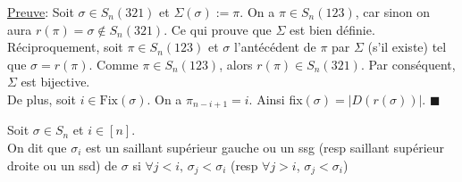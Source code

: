 \underline{Preuve}:
Soit $\sigma \in S_{n}(321)$ et $\Sigma(\sigma):=\pi$. On a $\pi \in S_{n}(123)$, car sinon on aura $r(\pi)=\sigma \notin S_{n}(321)$.
Ce qui prouve que $\Sigma$ est bien définie.\\
Réciproquement, soit $\pi \in S_{n}(123)$ et $\sigma$ l'antécédent de $\pi$ par $\Sigma$ (s'il existe) tel que $\sigma=r(\pi)$. Comme $\pi \in S_{n}(123)$, alors $r(\pi) \in S_{n}(321)$. Par conséquent, $\Sigma$ est bijective.\\
De plus, soit $i\in \text{Fix}(\sigma)$. On a $\pi_{n-i+1}=i$. Ainsi fix$(\sigma)=|D(r(\sigma))|$. $\blacksquare$

\begin{definition}
	\begin{rm}
		Soit $\sigma\in S_{n}$ et  $i\in [n]$.\\
		On dit que $\sigma_{i}$ est un saillant supérieur gauche ou un ssg (resp saillant
		supérieur droite ou un ssd)  de $\sigma$ si $\forall j<i\text{, }\sigma_{j}<\sigma_{i}$
		(resp $\forall j>i$, $\sigma_{j}<\sigma_{i}$)
	\end{rm}
\end{definition}

